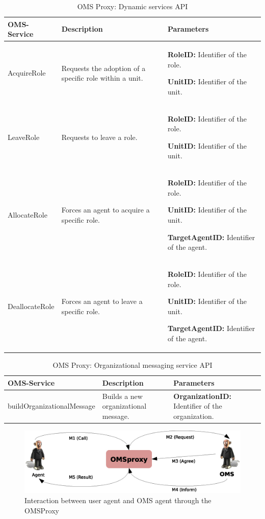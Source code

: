 \begin{table}[h!t]
\begin{tabular}{|l|p{5cm}|p{5cm}|}
\hline
OMS-Service & Description & Parameters \\ \hline
AcquireRole & Requests the adoption of a specific role within a unit.
 &

\textbf{RoleID:} Identifier of the role.

\textbf{
UnitID:} Identifier of the unit.

\\ \hline
LeaveRole & Requests to leave a role.
&

\textbf{RoleID:} Identifier of the role.

\textbf{UnitID:} Identifier of the unit.

\\ \hline

AllocateRole & Forces an agent to acquire a specific role.
 &

\textbf{RoleID:} Identifier of the role.

\textbf{UnitID:} Identifier of the unit.

\textbf{TargetAgentID:} Identifier of the agent.
 \\ \hline

DeallocateRole & Forces an agent to leave a specific role.
 &

\textbf{RoleID:} Identifier of the role.

\textbf{UnitID:} Identifier of the unit.

\textbf{TargetAgentID:} Identifier of the agent.
 \\ \hline
\end{tabular}
\caption{OMS Proxy: Dynamic services API}
\label{tab:thomas_OMSProxy_compound}
\end{table}


\begin{table}[h!t]
\begin{tabular}{|l|p{3cm}|p{5cm}|}
\hline
OMS-Service & Description & Parameters \\ \hline
buildOrganizationalMessage & Builds a new organizational message.
 &
\textbf{OrganizationID:} Identifier of the organization.
 \\ \hline
\end{tabular}
\caption{OMS Proxy: Organizational messaging service API}
\label{tab:thomas_OMSProxy_messaging}
\end{table}


\begin{figure}[h!t]
	\centering
	\includegraphics[width=1.0\textwidth]{Thomas/images/oms_omsProxy_interaction}
	\caption{Interaction between user agent and OMS agent through the OMSProxy}
\end{figure}


